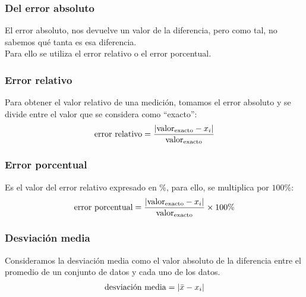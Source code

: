 \documentclass[12pt]{beamer}
\begin{document}
\begin{frame}
\frametitle{Del error absoluto}
El error absoluto, nos devuelve un valor de la diferencia, pero como tal, no sabemos qué tanta es esa diferencia.
\\
\bigskip
\pause
Para ello se utiliza el error relativo o el error porcentual.
\end{frame}
\begin{frame}
\frametitle{Error relativo}
Para obtener el valor relativo de una medición, tomamos el error absoluto y se divide entre el valor que se considera como \enquote{exacto}:
\pause
\begin{align*}
\text{error relativo} = \dfrac{\abs{\text{valor}_{\text{exacto}} - x_{i}}}{\text{valor}_{\text{exacto}}}
\end{align*}
\end{frame}
\begin{frame}
\frametitle{Error porcentual}
Es el valor del error relativo expresado en $\%$, para ello, se multiplica por $100\%$:
\pause
\begin{align*}
\text{error porcentual} = \dfrac{\abs{\text{valor}_{\text{exacto}} - x_{i}}}{\text{valor}_{\text{exacto}}} \times 100 \%
\end{align*}
\end{frame}
\begin{frame}
\frametitle{Desviación media}
Consideramos la desviación media como el valor absoluto de la diferencia entre el promedio de un conjunto de datos y cada uno de los datos.
\pause
\begin{align*}
\text{desviación media} = \abs{\bar{x} - x_{i}}
\end{align*}
\end{frame}
\end{document}
